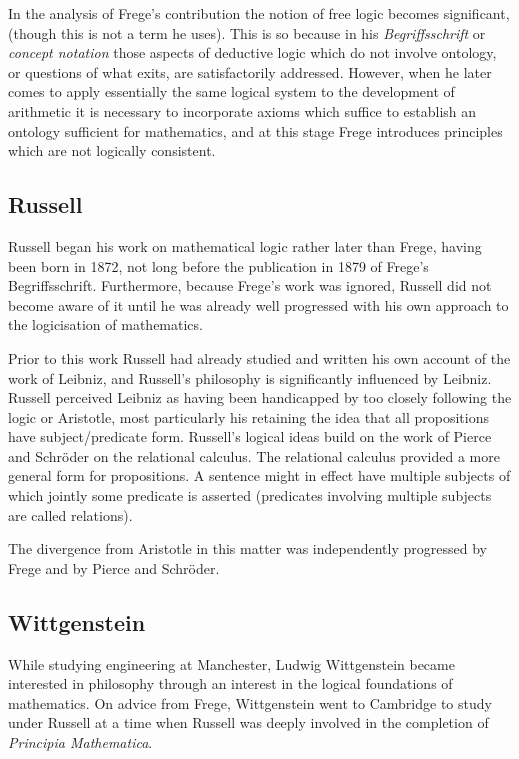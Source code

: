 In the analysis of Frege's contribution the notion of free logic
becomes significant, (though this is not a term he uses). 
This is so because in his \emph{Begriffsschrift} or \emph{concept
notation} those aspects of deductive logic which do not involve
ontology, or questions of what exits, are satisfactorily addressed. 
However, when he later comes to apply essentially the same logical
system to the development of arithmetic it is necessary to incorporate
axioms which suffice to establish an ontology sufficient for
mathematics, and at this stage Frege introduces principles which are
not logically consistent.

\subsection{Russell}

Russell began his work on mathematical logic rather later than Frege,
having been born in 1872, not long before the publication in 1879 of
Frege's Begriffsschrift. 
Furthermore, because Frege's work was ignored, Russell did not become
aware of it until he was already well progressed with his own approach
to the logicisation of mathematics. 

Prior to this work Russell had already studied and written his own
account of the work of Leibniz, and Russell's philosophy is
significantly influenced by Leibniz.
Russell perceived Leibniz as having been handicapped by too closely
following the logic or Aristotle, most particularly his retaining the
idea that all propositions have subject/predicate form. 
Russell's logical ideas build on the work of Pierce and Schr\"oder on the
relational calculus.
The relational calculus provided a more general form for
propositions.
A sentence might in effect have multiple subjects of which jointly
some predicate is asserted (predicates involving multiple subjects are
called relations).

The divergence from Aristotle in this matter was independently
progressed by Frege and by Pierce and Schr\"oder.

\subsection{Wittgenstein}

While studying engineering at Manchester, Ludwig Wittgenstein became
interested in philosophy through an interest in the logical
foundations of mathematics.
On advice from Frege, Wittgenstein went to Cambridge to study under
Russell at a time when Russell was deeply involved in the completion
of \emph{Principia Mathematica}\cite{russell10}.

